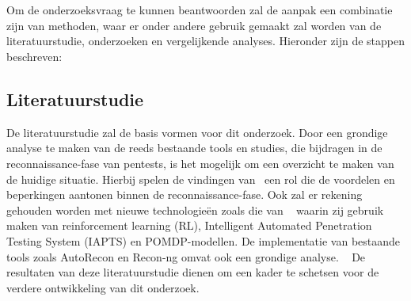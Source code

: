 
\chapter{}%
\label{ch:methodologie}


Om de onderzoeksvraag te kunnen beantwoorden zal de aanpak een combinatie zijn van methoden, waar er onder andere gebruik
gemaakt zal worden van de literatuurstudie, onderzoeken en vergelijkende analyses. Hieronder zijn de stappen beschreven:

\section{Literatuurstudie}

De literatuurstudie zal de basis vormen voor dit onderzoek. Door een grondige analyse te maken van de reeds bestaande tools en studies,
die bijdragen in de reconnaissance-fase van pentests, is het mogelijk om een overzicht te maken van de huidige situatie.
Hierbij spelen de vindingen van~\textcite{Shah,Kothia} een rol die de voordelen en beperkingen aantonen binnen de reconnaissance-fase.
Ook zal er rekening gehouden worden met nieuwe technologieën zoals die van ~\textcite{Ghanem,Hoang} waarin zij gebruik maken van
reinforcement learning (RL), Intelligent Automated Penetration Testing System (IAPTS) en POMDP-modellen. De implementatie van bestaande
tools zoals AutoRecon en Recon-ng omvat ook een grondige analyse. ~\autocite{Shebli}
De resultaten van deze literatuurstudie dienen om een kader te schetsen voor de verdere ontwikkeling van dit onderzoek.

